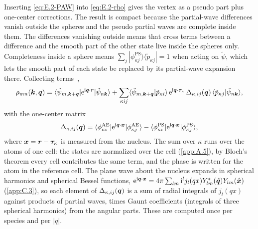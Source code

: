 Inserting \cref{eq:E.2-PAW} into \cref{eq:E.2-rho} gives the vertex as a pseudo part plus one-center corrections. The result is compact because the partial-wave differences vanish outside the spheres and the pseudo partial waves are complete inside them. The differences vanishing outside means that cross terms between a difference and the smooth part of the other state live inside the spheres only. Completeness inside a sphere means $\sum_j|\phi^{\mathrm{PS}}_{\kappa j}\rangle\langle\tilde p_{\kappa j}| = 1$ when acting on $\tilde\psi$, which lets the smooth part of each state be replaced by its partial-wave expansion there. Collecting terms~\cite{blochl1994projector},
\begin{equation}
  \rho_{mn}(\bm{k}, \bm{q}) = \langle\tilde\psi_{m,\bm{k}+\bm{q}}|\mathrm{e}^{\mathrm{i}\bm{q}\cdot\bm{r}}|\tilde\psi_{n\bm{k}}\rangle
  + \sum_{\kappa ij}\langle\tilde\psi_{m,\bm{k}+\bm{q}}|\tilde p_{\kappa i}\rangle\,\mathrm{e}^{\mathrm{i}\bm{q}\cdot\bm{\tau}_\kappa}\,\Delta_{\kappa,ij}(\bm{q})\,\langle\tilde p_{\kappa j}|\tilde\psi_{n\bm{k}}\rangle ,
  \label{eq:E.2-rhoPAW}
\end{equation}
with the one-center matrix
\begin{equation}
  \Delta_{\kappa,ij}(\bm{q}) = \langle\phi^{\mathrm{AE}}_{\kappa i}|\mathrm{e}^{\mathrm{i}\bm{q}\cdot\bm{x}}|\phi^{\mathrm{AE}}_{\kappa j}\rangle - \langle\phi^{\mathrm{PS}}_{\kappa i}|\mathrm{e}^{\mathrm{i}\bm{q}\cdot\bm{x}}|\phi^{\mathrm{PS}}_{\kappa j}\rangle ,
  \label{eq:E.2-onecentre}
\end{equation}
where $\bm{x} = \bm{r} - \bm{\tau}_\kappa$ is measured from the nucleus. The sum over $\kappa$ runs over the atoms of one cell: the states are normalized over the cell (\cref{app:A.5}), by Bloch's theorem every cell contributes the same term, and the phase is written for the atom in the reference cell. The plane wave about the nucleus expands in spherical harmonics and spherical Bessel functions, $\mathrm{e}^{\mathrm{i}\bm{q}\cdot\bm{x}} = 4\pi\sum_{lm}\mathrm{i}^lj_l(qx)Y^*_{lm}(\hat{\bm{q}})Y_{lm}(\hat{\bm{x}})$ (\cref{app:C.3}), so each element of $\Delta_{\kappa,ij}(\bm{q})$ is a sum of radial integrals of $j_l(qx)$ against products of partial waves, times Gaunt coefficients (integrals of three spherical harmonics) from the angular parts. These are computed once per species and per $|q|$.

